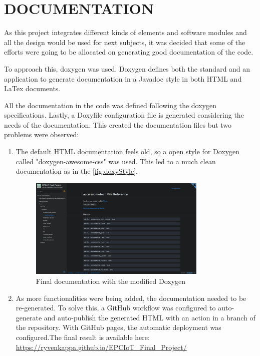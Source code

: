 \section{DOCUMENTATION}
As this project integrates different kinds of elements and software modules and all the design would be used for next subjects, it was decided that some of the efforts were going to be allocated on generating 
good documentation of the code.

To approach this, doxygen\cite{DoxygenGettingstarted} was used. Doxygen defines both the standard and an application to generate documentation in a Javadoc style in both HTML and LaTex documents.

All the documentation in the code was defined following the doxygen specifications. Lastly, a Doxyfile configuration file is generated considering the needs of the documentation. This created the documentation files 
but two problems were observed:
\begin{enumerate}
    \item The default HTML documentation feels old, so a open style for Doxygen called "doxygen-awesome-css"\cite{jotheprodoxygenawesomecss} was used. This led to a much clean documentation as in the \autoref{fig:doxyStyle}.
    
    \begin{figure}[H]
        \centering
        \includegraphics[width=0.8\textwidth]{images/8/doxy.png}
        \caption{Final documentation with the modified Doxygen}
        \label{fig:doxyStyle}
    \end{figure}

    \item As more functionalities were being added, the documentation needed to be re-generated. To solve this, a GitHub workflow was configured to auto-generate and auto-publish the generated HTML with an action in a branch of the repository. With GitHub pages, 
    the automatic deployment was configured.\newline The final result is available here: \url{https://ryvenkappa.github.io/EPCIoT_Final_Project/}
\end{enumerate}
